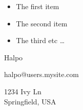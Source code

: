 
\begin{itemize}
  \item The first item
  \item The second item
  \item The third etc \ldots
\end{itemize}


\begin{description}[style=multiline,leftmargin=3cm,font=\normalfont]
  \item[Name:]  Halpo
  \item[Email Address:] halpo@users.mysite.com
  \item[Address:]  1234 Ivy Ln \\ Springfield, USA
\end{description}
